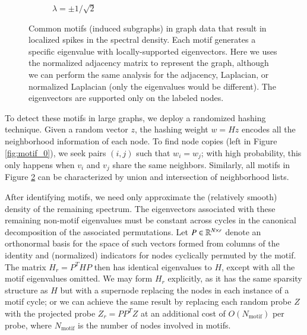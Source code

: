 \begin{figure}[htp]
\begin{center}
\begin{subfigure}{0.47\textwidth}
		\vspace{3.5cm}
		\caption{$\lambda = \pm1/\sqrt{2}$}\label{fig:motif_sqrt2}
  \end{subfigure}
  \caption{Common motifs (induced subgraphs) in graph data that result in
  localized spikes in the spectral density. Each motif generates a specific
  eigenvalue with locally-supported eigenvectors. Here we uses the normalized
  adjacency matrix to represent the graph, although we can perform the same
  analysis for the adjacency, Laplacian, or normalized Laplacian (only the
  eigenvalues would be different). The eigenvectors are supported only on the
  labeled nodes.}\label{fig:motifs}
  \end{center}
\end{figure}

To detect these motifs in large graphs, we deploy a randomized hashing
technique. Given a random vector $z$, the hashing weight $w=Hz$ encodes all
the neighborhood information of each node. To find node copies (left in Figure 
\ref{fig:motif_0}), we seek pairs $(i, j)$ such that $w_i=w_j$; with high
probability, this only happens when $v_i$ and $v_j$ share the same neighbors.
Similarly, all motifs in Figure \ref{fig:motifs} can be characterized by union
and intersection of neighborhood lists.

After identifying motifs, we need only approximate the (relatively smooth)
density of the remaining spectrum.  The eigenvectors associated with these
remaining non-motif eigenvalues must be constant across cycles in the canonical
decomposition of the associated permutations.  Let $P \in \mathbb{R}^{N \times r}$
denote an orthonormal basis for the space of such vectors formed from columns of
the identity and (normalized) indicators for nodes cyclically permuted by the
motif.  The matrix $H_r = P^T H P$ then has identical eigenvalues to $H$, except
with all the motif eigenvalues omitted. We may form $H_r$ explicitly, as it has
the same sparsity structure as $H$ but with a supernode replacing the nodes in
each instance of a motif cycle; or we can achieve the same result by replacing
each random probe $Z$ with the projected probe $Z_r = PP^T Z$ at an additional
cost of $O(N_{\mathrm{motif}})$ per probe, where $N_{\mathrm{motif}}$ is the
number of nodes involved in motifs.

